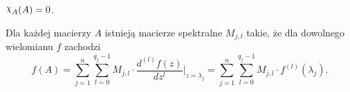 
\begin{theorem}
  $\mychi_A(A) = 0$.
\end{theorem}

\begin{theorem}
  Dla każdej macierzy $A$ istnieją macierze spektralne $M_{j,l}$ takie, że dla dowolnego
  wielomianu $f$ zachodzi
  \[
    f(A) = \sum_{j=1}^{n} \sum_{l=0}^{q_j - 1} M_{j,l} \cdot
    \frac{d^{(l)} f(z)}{dz^l} \bigg\vert_{z = \lambda_j} =
    \sum_{j=1}^{n} \sum_{l=0}^{q_j - 1} M_{j,l} \cdot f^{(l)}(\lambda_j).
  \]
\end{theorem}





















